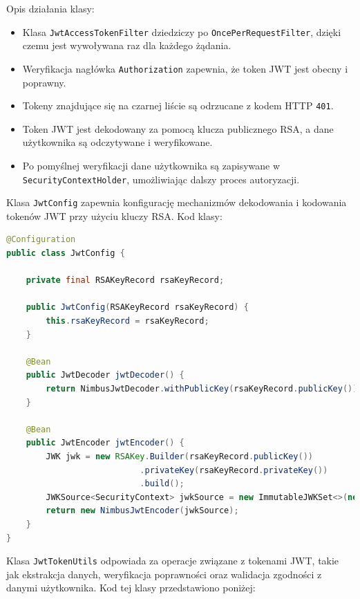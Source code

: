 Opis działania klasy:

\begin{itemize}
    \item Klasa \texttt{JwtAccessTokenFilter} dziedziczy po \texttt{OncePerRequestFilter}, dzięki czemu jest wywoływana raz dla każdego żądania.
    \item Weryfikacja nagłówka \texttt{Authorization} zapewnia, że token JWT jest obecny i poprawny.
    \item Tokeny znajdujące się na czarnej liście są odrzucane z kodem HTTP \texttt{401}.
    \item Token JWT jest dekodowany za pomocą klucza publicznego RSA, a dane użytkownika są odczytywane i weryfikowane.
    \item Po pomyślnej weryfikacji dane użytkownika są zapisywane w \texttt{SecurityContextHolder}, umożliwiając dalszy proces autoryzacji.
\end{itemize}


Klasa \texttt{JwtConfig} zapewnia konfigurację mechanizmów dekodowania i kodowania tokenów JWT przy użyciu kluczy RSA. Kod klasy:

\begin{lstlisting}[language=Java, caption=Klasa \texttt{JwtConfig}]
@Configuration
public class JwtConfig {

    private final RSAKeyRecord rsaKeyRecord;

    public JwtConfig(RSAKeyRecord rsaKeyRecord) {
        this.rsaKeyRecord = rsaKeyRecord;
    }

    @Bean
    public JwtDecoder jwtDecoder() {
        return NimbusJwtDecoder.withPublicKey(rsaKeyRecord.publicKey()).build();
    }

    @Bean
    public JwtEncoder jwtEncoder() {
        JWK jwk = new RSAKey.Builder(rsaKeyRecord.publicKey())
                           .privateKey(rsaKeyRecord.privateKey())
                           .build();
        JWKSource<SecurityContext> jwkSource = new ImmutableJWKSet<>(new JWKSet(jwk));
        return new NimbusJwtEncoder(jwkSource);
    }
}
\end{lstlisting}

Klasa \texttt{JwtTokenUtils} odpowiada za operacje związane z tokenami JWT, takie jak ekstrakcja danych, weryfikacja poprawności oraz walidacja zgodności z danymi użytkownika. Kod tej klasy przedstawiono poniżej:

